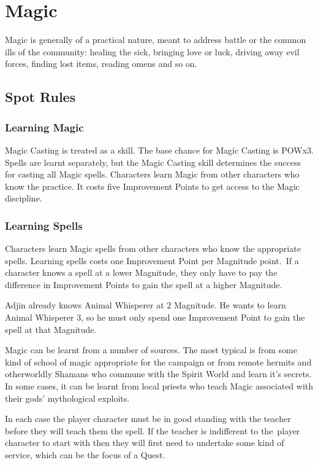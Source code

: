 \chapter{Magic}
\label{ch:magic}

Magic is generally of a practical nature, meant to address battle or the common ills of the community: healing the sick, bringing love or luck, driving away evil forces, finding lost items, reading omens and so on. 


\section{Spot Rules}

\subsection{Learning Magic}
Magic Casting is treated as a skill. The base chance for Magic Casting is POWx3. Spells are learnt separately, but the Magic Casting skill determines the success for casting all Magic spells. Characters learn Magic from other characters who know the practice. It costs five Improvement Points to get access to the Magic discipline.

\subsection{Learning Spells}
Characters learn Magic spells from other characters who know the appropriate spells. Learning spells costs one Improvement Point per Magnitude point. If a character knows a spell at a lower Magnitude, they only have to pay the difference in Improvement Points to gain the spell at a higher Magnitude.

\begin{rpg-examplebox}
Adjin already knows Animal Whisperer at 2 Magnitude. He wants to learn Animal Whisperer 3, so he must only spend one Improvement Point to gain the spell at that Magnitude.
\end{rpg-examplebox}

Magic can be learnt from a number of sources. The most typical is from some kind of school of magic appropriate for the campaign or from remote hermits and otherworldly Shamans who commune with the Spirit World and learn it's secrets. In some cases, it can be learnt from local priests who teach Magic associated with their gods’ mythological exploits.

In each case the player character must be in good standing with the teacher before they will teach them the spell. If the teacher is indifferent to the player character to start with then they will first need to undertake some kind of service, which can be the focus of a Quest.

